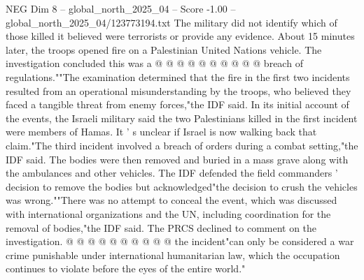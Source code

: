 \begin{textsample}{NEG Dim 8 – global\_north\_2025\_04 – Score -1.00 – global\_north\_2025\_04/123773194.txt}
The military did not identify which of those killed it believed were terrorists or provide any evidence.
About 15 minutes later, the troops opened fire on a Palestinian United Nations vehicle.
The investigation concluded this was a @ @ @ @ @ @ @ @ @ @ breach of regulations.""The examination determined that the fire in the first two incidents resulted from an operational misunderstanding by the troops, who believed they faced a tangible threat from enemy forces,"the IDF said.
In its initial account of the events, the Israeli military said the two Palestinians killed in the first incident were members of Hamas.
It ' s unclear if Israel is now walking back that claim."The third incident involved a breach of orders during a combat setting,"the IDF said.
The bodies were then removed and buried in a mass grave along with the ambulances and other vehicles.
The IDF defended the field commanders ' decision to remove the bodies but acknowledged"the decision to crush the vehicles was wrong.""There was no attempt to conceal the event, which was discussed with international organizations and the UN, including coordination for the removal of bodies,"the IDF said.
The PRCS declined to comment on the investigation. @ @ @ @ @ @ @ @ @ @ the incident"can only be considered a war crime punishable under international humanitarian law, which the occupation continues to violate before the eyes of the entire world."

\end{textsample}
